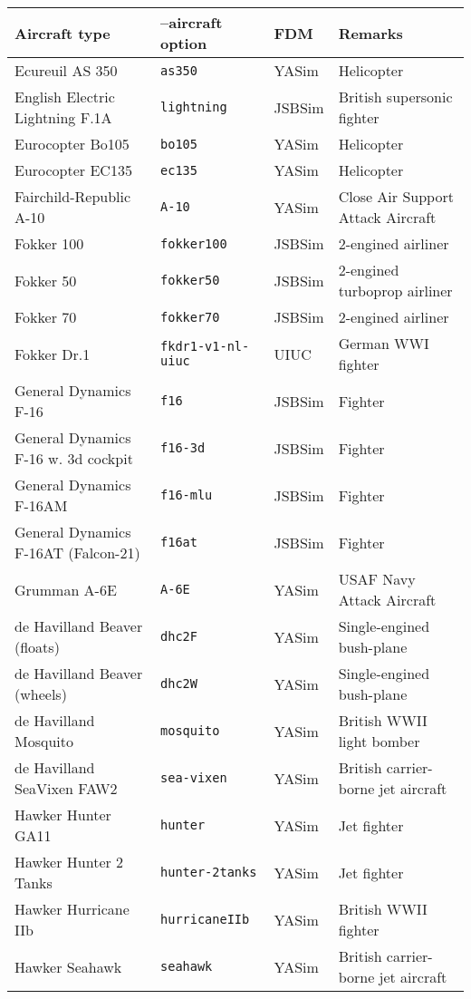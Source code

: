 \begin{tabular}{l|l|l|l}
Aircraft type       & --aircraft option & FDM    & Remarks\\\hline
   Ecureuil AS 350 & \texttt{as350} & YASim & Helicopter\\
   English Electric Lightning F.1A & \texttt{lightning} & JSBSim & British supersonic fighter\\
   Eurocopter Bo105 & \texttt{bo105} & YASim & Helicopter \\
   Eurocopter EC135 & \texttt{ec135} & YASim & Helicopter\\
   Fairchild-Republic A-10 & \texttt{A-10}  & YASim  & Close Air Support Attack Aircraft \\
   Fokker 100 & \texttt{fokker100} & JSBSim & 2-engined airliner\\
   Fokker 50 & \texttt{fokker50} & JSBSim & 2-engined turboprop airliner\\
   Fokker 70 & \texttt{fokker70} & JSBSim & 2-engined airliner\\
   Fokker Dr.1 & \texttt{fkdr1-v1-nl-uiuc} & UIUC & German WWI fighter\\
   General Dynamics F-16 & \texttt{f16} & JSBSim & Fighter\\
   General Dynamics F-16 w. 3d cockpit & \texttt{f16-3d} & JSBSim & Fighter\\
   General Dynamics F-16AM & \texttt{f16-mlu} & JSBSim & Fighter\\
   General Dynamics F-16AT (Falcon-21) & \texttt{f16at} & JSBSim & Fighter\\
   Grumman A-6E & \texttt{A-6E} & YASim & USAF Navy Attack Aircraft\\
   de Havilland Beaver (floats) & \texttt{dhc2F} & YASim & Single-engined bush-plane\\
   de Havilland Beaver (wheels) & \texttt{dhc2W} & YASim & Single-engined bush-plane\\
   de Havilland Mosquito & \texttt{mosquito} & YASim & British WWII light bomber\\
   de Havilland SeaVixen FAW2 & \texttt{sea-vixen} & YASim & British carrier-borne jet aircraft\\
   Hawker Hunter GA11 & \texttt{hunter} & YASim & Jet fighter\\
   Hawker Hunter 2 Tanks & \texttt{hunter-2tanks} & YASim & Jet fighter\\
   Hawker Hurricane IIb & \texttt{hurricaneIIb} & YASim & British WWII fighter\\
   Hawker Seahawk & \texttt{seahawk} & YASim & British carrier-borne jet aircraft\\

\end{tabular}
